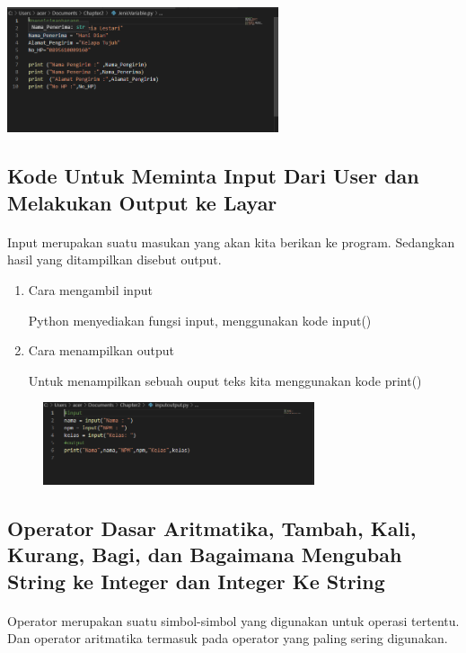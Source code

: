 \documentclass{article}
\begin{document}
\paragraph{}
    \centerline{\includegraphics[width=8cm]{figure/A.PNG}}

\subsection{Kode Untuk Meminta Input Dari User dan Melakukan Output ke Layar}
\paragraph{} Input merupakan suatu masukan yang akan kita berikan ke program. Sedangkan hasil yang ditampilkan disebut output.
\begin{enumerate}
    \item Cara mengambil input
        \par Python menyediakan fungsi input, menggunakan kode input()
    \item Cara menampilkan output
        \par Untuk menampilkan sebuah ouput teks kita menggunakan kode print()
\end{enumerate}
\begin{figure}[h]
\centerline{\includegraphics[width=8cm]{figure/B.PNG}}
\end{figure}

\subsection{Operator Dasar Aritmatika, Tambah, Kali, Kurang, Bagi, dan Bagaimana Mengubah String ke Integer dan Integer Ke String}
\paragraph{} Operator merupakan suatu simbol-simbol yang digunakan untuk operasi tertentu. Dan operator aritmatika termasuk pada operator yang paling sering digunakan. 
\end{document}
